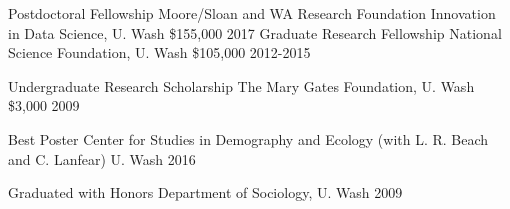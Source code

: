 

\begin{cvhonors}

  \cvhonor
    {Postdoctoral Fellowship} %
    {Moore/Sloan and WA Research Foundation Innovation in Data Science, U. Wash} %
    {\$155,000} %
    {2017} %
  \cvhonor
    {Graduate Research Fellowship} %
    {National Science Foundation, U. Wash} %
    {\$105,000} %
    {2012-2015} %

  \cvhonor
    {Undergraduate Research Scholarship} %
    {The Mary Gates Foundation, U. Wash} %
    {\$3,000} %
    {2009} %


\end{cvhonors}




\begin{cvhonors}

  \cvhonor
    {Best Poster} %
    {Center for Studies in Demography and Ecology (with L. R. Beach and C. Lanfear) U. Wash} %
    {} %
    {2016} %

  \cvhonor
    {Graduated with Honors} %
    {Department of Sociology, U. Wash} %
    {} %
    {2009} %

\end{cvhonors}
